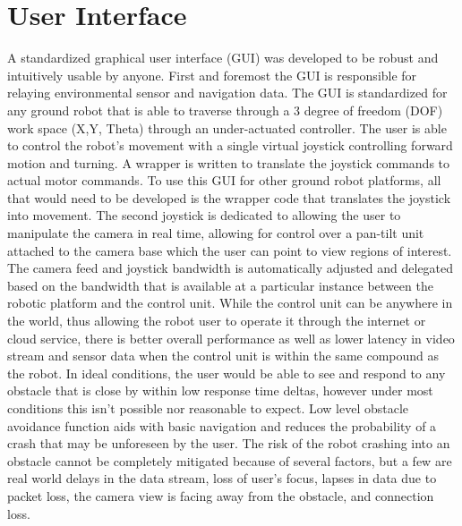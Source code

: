 \section{User Interface}\label{sec:ui}

A standardized graphical user interface (GUI) was developed to be robust and intuitively usable by anyone. First and foremost the GUI is responsible for relaying environmental sensor and navigation data. The GUI is standardized for any ground robot that is able to traverse through a 3 degree of freedom (DOF) work space (X,Y, Theta) through an under-actuated controller. The user is able to control the robot's movement with a single virtual joystick controlling forward motion and turning. A wrapper is written to translate the joystick commands to actual motor commands. To use this GUI for other ground robot platforms, all that would need to be developed is the wrapper code that translates the joystick into movement. The second joystick is dedicated to allowing the user to manipulate the camera in real time, allowing for control over a pan-tilt unit attached to the camera base which the user can point to view regions of interest. The camera feed and joystick bandwidth is automatically adjusted and delegated based on the bandwidth that is available at a particular instance between the robotic platform and the control unit. While the control unit can be anywhere in the world, thus allowing the robot user to operate it through the internet or cloud service, there is better overall performance as well as lower latency in video stream and sensor data when the control unit is within the same compound as the robot. In ideal conditions, the user would be able to see and respond to any obstacle that is close by within low response time deltas, however under most conditions this isn't possible nor reasonable to expect. Low level obstacle avoidance function aids with basic navigation and reduces the probability of a crash that may be unforeseen by the user. The risk of the robot crashing into an obstacle cannot be completely mitigated because of several factors, but a few are real world delays in the data stream, loss of user's focus, lapses in data due to packet loss, the camera view is facing away from the obstacle, and connection loss.


